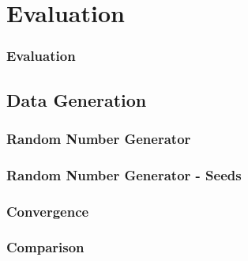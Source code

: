 \section{Evaluation}

\begin{frame}
  \frametitle{Evaluation}
\end{frame}

\subsection{Data Generation}

\begin{frame}
  \frametitle{Random Number Generator}
\end{frame}

\begin{frame}
  \frametitle{Random Number Generator - Seeds}
\end{frame}


\begin{frame}
  \frametitle{Convergence}
\end{frame}

\begin{frame}
  \frametitle{Comparison}
\end{frame}